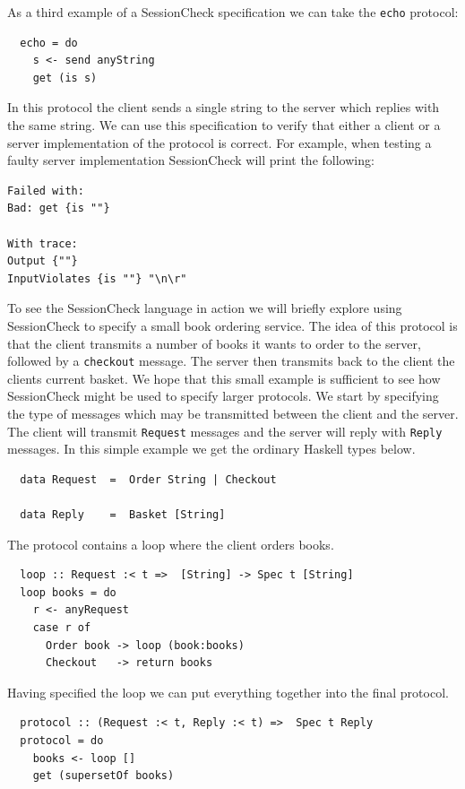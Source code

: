\documentclass{article}
\begin{document}
As a third example of a SessionCheck specification we can take the \texttt{echo} protocol:
%
\begin{verbatim}
  echo = do
    s <- send anyString
    get (is s)
\end{verbatim}
%
In this protocol the client sends a single string to the server which
replies with the same string.
%
We can use this specification to verify that either a client or a server implementation of
the protocol is correct.
%
For example, when testing a faulty server implementation SessionCheck will print the following:
%
\begin{verbatim}
Failed with:
Bad: get {is ""}

With trace:
Output {""}
InputViolates {is ""} "\n\r"
\end{verbatim}

To see the SessionCheck language in action we will briefly explore
using SessionCheck to specify a small book ordering service.
%
The idea of this protocol is that the client transmits a number of
books it wants to order to the server, followed by a
\texttt{checkout} message.
%
The server then transmits back to the client the clients current
basket.
%
We hope that this small example is sufficient to see how SessionCheck
might be used to specify larger protocols.
%
We start by specifying the type of messages which may be transmitted
between the client and the server.
%
The client will transmit \texttt{Request} messages and
the server will reply with \texttt{Reply} messages.
%
In this simple example we get the ordinary Haskell types below.
%
\begin{verbatim}
  data Request  =  Order String | Checkout

  data Reply    =  Basket [String]
\end{verbatim}

The protocol contains a loop where the client orders books.
%
\begin{verbatim}
  loop :: Request :< t =>  [String] -> Spec t [String]
  loop books = do
    r <- anyRequest
    case r of
      Order book -> loop (book:books)
      Checkout   -> return books
\end{verbatim}
%
Having specified the loop we can put everything together into the final protocol.
%
\begin{verbatim}
  protocol :: (Request :< t, Reply :< t) =>  Spec t Reply
  protocol = do
    books <- loop []
    get (supersetOf books)
\end{verbatim}
\end{document}
